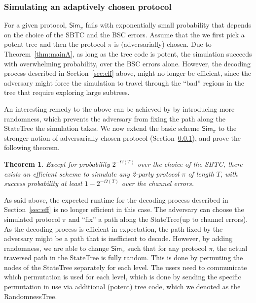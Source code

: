 \documentclass[ letterpaper, 11pt]{article}
\newtheorem{theorem}{Theorem}[section]
\newcommand{\statetree}{{\textsf{StateTree}}\xspace}
\newcommand{\randomtree}{{\textsf{RandomnessTree}}\xspace}
\newcommand{\potent}{potent\xspace}
\newcommand{\Sim}{{\mathsf{Sim}_\pi}}
\newcommand{\KTC}{\textsf{SBTC}\xspace}
\begin{document}
\subsubsection{Simulating an adaptively chosen protocol}\label{sec:adaptive}




For a given protocol,  $\Sim$ fails with exponentially small probability that
depends on the choice of the \KTC and the BSC errors.
Assume that the we first pick a \potent tree
and then the protocol $\pi$ is (adversarially) chosen.
Due to Theorem~\ref{thm:mainA}, as long as the tree code is  \potent,
the simulation succeeds with overwhelming probability, over the
BSC errors alone. However, the decoding process described in
Section~\ref{sec:eff} above, might no longer be efficient,
since the adversary might force the simulation
to travel through the ``bad'' regions in the tree that require exploring large subtrees.

An interesting remedy to the above
can be achieved by
by introducing more randomness,
which prevents the adversary from fixing the path along the \statetree the simulation takes.
We now extend  the basic scheme $\Sim$
to the stronger notion
of adversarially chosen protocol (Section~\ref{sec:adaptive}), and prove the following theorem.
\begin{theorem}\label{thm:mainAdaptive}
Except for probability $2^{-\Omega(T)}$ over the choice of the \KTC, there exists
an efficient scheme to simulate any 2-party protocol $\pi$
of length $T$, with success probability at least $1-2^{-\Omega(T)}$ over the channel errors.
\end{theorem}

As said above,
the expected runtime for the decoding process described in Section~\ref{sec:eff}
is no longer efficient in this case. The adversary can choose
the simulated protocol $\pi$ and  ``fix'' a path along the
\statetree (up to channel errors). As the decoding process is efficient in expectation,
the path fixed by the adversary might be a path that is inefficient to decode.
However, by adding randomness, we are able to change $\Sim$ such that
for any protocol $\pi$, the actual traversed path in the \statetree is fully random.
This is done by permuting the nodes of the \statetree
separately for each level. The users need to communicate which permutation
is used for each level, which is done by sending the specific permutation in use via
additional (\potent) tree code, which we denoted as the \randomtree.
\end{document}
